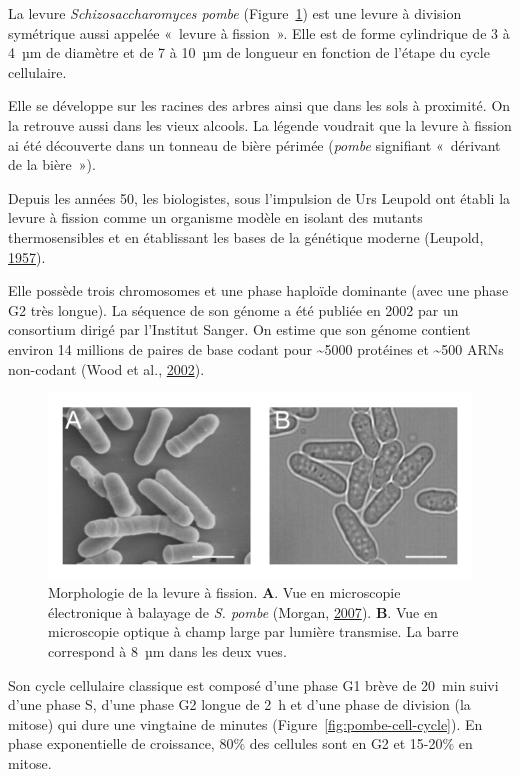 \documentclass[12pt,a4paper,twoside,openright]{book}
\begin{document}
La levure \emph{Schizosaccharomyces pombe} (Figure~\ref{fig:pombe}) est
une levure à division symétrique aussi appelée «~levure à fission~».
Elle est de forme cylindrique de 3 à 4~µm de diamètre et de 7 à 10~µm de
longueur en fonction de l'étape du cycle cellulaire.

Elle se développe sur les racines des arbres ainsi que dans les sols à
proximité. On la retrouve aussi dans les vieux alcools. La légende
voudrait que la levure à fission ai été découverte dans un tonneau de
bière périmée (\emph{pombe} signifiant «~dérivant de la bière~»).

Depuis les années 50, les biologistes, sous l'impulsion de Urs Leupold
ont établi la levure à fission comme un organisme modèle en isolant des
mutants thermosensibles et en établissant les bases de la génétique
moderne (Leupold, \protect\hyperlink{ref-Leupold1957}{1957}).

Elle possède trois chromosomes et une phase haploïde dominante (avec une
phase G2 très longue). La séquence de son génome a été publiée en 2002
par un consortium dirigé par l'Institut Sanger. On estime que son génome
contient environ 14 millions de paires de base codant pour
\textasciitilde{}5000 protéines et \textasciitilde{}500 ARNs non-codant
(Wood et al., \protect\hyperlink{ref-Wood2002a}{2002}).

\begin{figure}[htbp]
\centering
\includegraphics{figures/intro/pombe.png}
\caption[Morphologie de la levure à fission]{\label{fig:pombe}Morphologie
de la levure à fission. \textbf{A}. Vue en microscopie électronique à
balayage de \emph{S. pombe} (Morgan,
\protect\hyperlink{ref-Morgan2007}{2007}). \textbf{B}. Vue en
microscopie optique à champ large par lumière transmise. La barre
correspond à 8~µm dans les deux vues.}
\end{figure}

Son cycle cellulaire classique est composé d'une phase G1 brève de
20~min suivi d'une phase S, d'une phase G2 longue de 2~h et d'une phase
de division (la mitose) qui dure une vingtaine de minutes
(Figure~\ref{fig:pombe-cell-cycle}). En phase exponentielle de
croissance, 80\% des cellules sont en G2 et 15-20\% en mitose.
\end{document}
